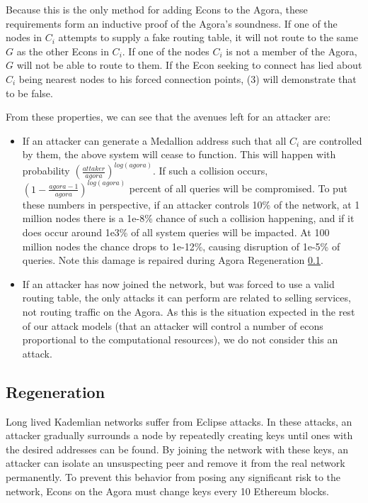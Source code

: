 \documentclass{article}
\begin{document}
Because this is the only method for adding Econs to the Agora, these requirements form an inductive proof of the Agora's soundness. If one of the nodes in $C_i$ attempts to supply a fake routing table, it will not route to the same $G$ as the other Econs in $C_i$. If one of the nodes $C_i$ is not a member of the Agora, $G$ will not be able to route to them. If the Econ seeking to connect has lied about $C_i$ being nearest nodes to his forced connection points, (3) will demonstrate that to be false.

From these properties, we can see that the avenues left for an attacker are:

\begin{itemize}
    \item If an attacker can generate a Medallion address such that all $C_i$ are controlled by them, the above system will cease to function. This will happen with probability $(\frac{attaker}{agora})^{log(agora)}$. If such a collision occurs, $(1 - \frac{agora-1}{agora})^{log(agora)}$ percent of all queries will be compromised. To put these numbers in perspective, if an attacker controls 10\% of the network, at 1 million nodes there is a 1e-8\% chance of such a collision happening, and if it does occur around 1e3\% of all system queries will be impacted. At 100 million nodes the chance drops to 1e-12\%, causing disruption of 1e-5\% of queries. Note this damage is repaired during Agora Regeneration \ref{agora-regen}.
    \item If an attacker has now joined the network, but was forced to use a valid routing table, the only attacks it can perform are related to selling services, not routing traffic on the Agora. As this is the situation expected in the rest of our attack models (that an attacker will control a number of econs proportional to the computational resources), we do not consider this an attack.
\end{itemize}

\subsection{Regeneration}
\label{agora-regen}

Long lived Kademlian networks suffer from Eclipse attacks. In these attacks, an attacker gradually surrounds a node by repeatedly creating keys until ones with the desired addresses can be found. By joining the network with these keys, an attacker can isolate an unsuspecting peer and remove it from the real network permanently. To prevent this behavior from posing any significant risk to the network, Econs on the Agora must change keys every 10 Ethereum blocks.
\end{document}
